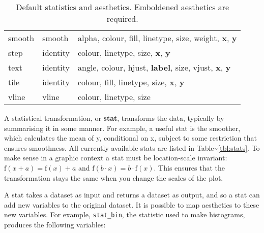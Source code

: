 \begin{table}
\begin{center}
\begin{tabular}{llp{3in}}
  smooth     & smooth    & alpha, colour, fill, linetype, size, weight, \textbf{x}, \textbf{y}                                                      \\
  step       & identity  & colour, linetype, size, \textbf{x}, \textbf{y}                                                                           \\
  text       & identity  & angle, colour, hjust, \textbf{label}, size, vjust, \textbf{x}, \textbf{y}                                               \\
  tile       & identity  & colour, fill, linetype, size, \textbf{x}, \textbf{y}                                                                     \\
  vline      & vline     & colour, linetype, size                                                                                                     \\
  
  \bottomrule
  \end{tabular}
  \end{center}
  \caption{Default statistics and aesthetics.  Emboldened aesthetics are required.}
  \label{tbl:geom-aesthetics}
\end{table}


A statistical transformation, or \textbf{stat}, transforms the data,
typically by summarising it in some manner. For example, a useful stat
is the smoother, which calculates the mean of y, conditional on x,
subject to some restriction that ensures smoothness. All currently
available stats are listed in Table\textasciitilde{}\ref{tbl:stats}. To
make sense in a graphic context a stat must be location-scale invariant:
\(\mbox{f}(x + a) = \mbox{f}(x) + a\) and
\(\mbox{f}(b \cdot x) = b \cdot \mbox{f}(x)\). This ensures that the
transformation stays the same when you change the scales of the plot.

A stat takes a dataset as input and returns a dataset as output, and so
a stat can add new variables to the original dataset. It is possible to
map aesthetics to these new variables. For example, \texttt{stat\_bin},
the statistic used to make histograms, produces the following variables:
 

